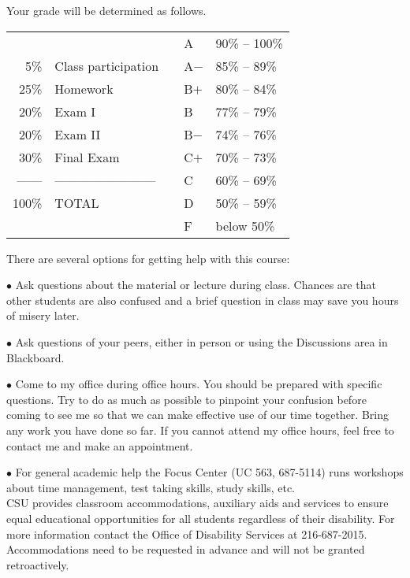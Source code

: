 \documentclass[11pt]{article}
\begin{document}
Your grade will be determined as follows. 

\medskip


\begin{tabular}{rlp{4cm}ll}
	& & & A & 90\% -- 100\%\\
	5\% & Class participation & & A$-$ & 85\% -- 89\%\\
	25\% & Homework & & B$+$ & 80\% -- 84\%\\
	20\% &  Exam I & & B & 77\% -- 79\%\\ 
	20\% & Exam II & & B$-$ & 74\% -- 76\%\\
	30\% & Final Exam  & & C$+$ & 70\% -- 73\%\\
	------ & ------------------------ & & C & 60\% -- 69\%\\
	100\% & TOTAL  & & D & 50\% -- 59\%\\ 
	& & & F & below 50\%
\end{tabular}

\bigskip


There are several options for getting help with this course:

$\bullet$ Ask questions about the material or lecture during
class. Chances are that other students are also confused and a brief
question in class may save you hours of misery later.
  
$\bullet$ Ask questions of your peers, either in person or using the
Discussions area in Blackboard. 

$\bullet$ Come to my office during office hours. You should be
prepared with specific questions. Try to do as much as possible to
pinpoint your confusion before coming to see me so that we can make
effective use of our time together. Bring any work you have done so
far. If you cannot attend my office hours, feel free to contact me and
make an appointment.
  
$\bullet$ For general academic help the Focus Center (UC 563,
687-5114) runs workshops about time management, test taking skills,
study skills, etc. \\

 CSU provides 
classroom accommodations, auxiliary aids and services to ensure equal educational
opportunities for all students regardless of their disability. For more information contact
the Office of Disability Services at 216-687-2015. Accommodations need to be
requested in advance and will not be granted retroactively.\\
\end{document}
